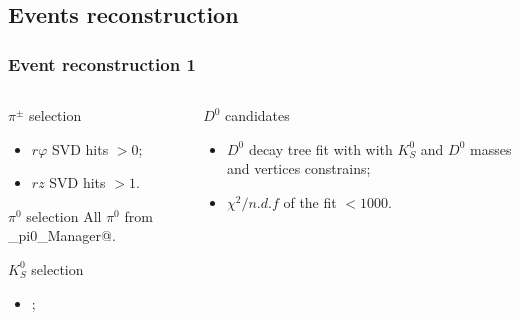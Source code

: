 \documentclass[10 pt,compress,mathserif]{beamer}
\begin{document}
\subsection{Events reconstruction}
\begin{frame}[containsverbatim]
 \frametitle{Event reconstruction 1}
 \begin{columns}
  \begin{column}{0.5\textwidth}
   \begin{block}{$\pi^{\pm}$ selection}
  \begin{itemize}
   \item $r\varphi$ SVD hits $>0$;
   \item $rz$ SVD hits $>1$.
  \end{itemize}
 \end{block}
 \begin{block}{$\pi^0$ selection}
  All $\pi^0$ from \verb@Mdst_pi0_Manager@.
 \end{block}
 \begin{block}{$K_S^0$ selection}
 \begin{itemize}
  \item \verb@nisKsFinder@;
 \end{itemize}
 \end{block}
  \end{column}
  \begin{column}{0.5\textwidth}
   \begin{block}{$D^0$ candidates}
    \begin{itemize}
     \item $D^0$ decay tree fit with \verb@ExKFitter@ with $K_S^0$ and $D^0$ masses and vertices constrains;
     \item $\chi^2/n.d.f$ of the fit $<1000$.
    \end{itemize}
   \end{block}
  \end{column}
 \end{columns}
\end{frame}
\end{document}
